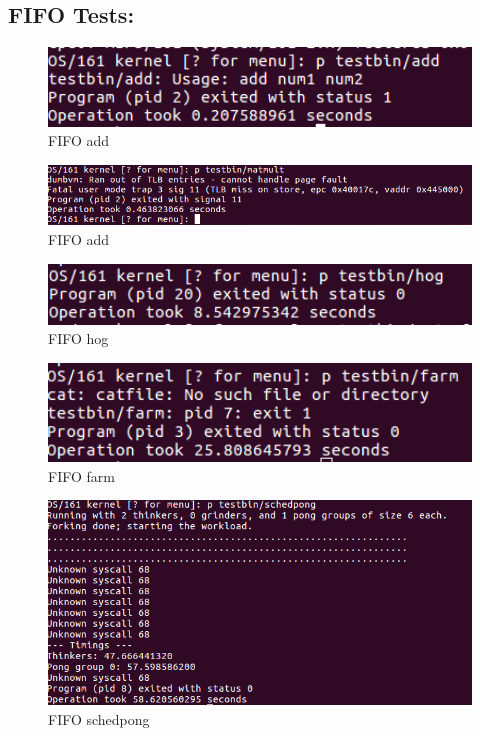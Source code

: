 \documentclass[12pt]{article}
\begin{document}
\subsection{FIFO Tests:}
\begin{figure}[ht!]
	\centering
	\includegraphics[width=120mm]{FIFOadd.png}
	\caption{FIFO add \label{FIFOADD}}
\end{figure}
\begin{figure}[ht!]
	\centering
	\includegraphics[width=120mm]{FIFOmatmult.png}
	\caption{FIFO add \label{FIFOMATMULT}}
\end{figure}
\begin{figure}[ht!]
	\centering
	\includegraphics[width=120mm]{FIFOhog.png}
	\caption{FIFO hog \label{FIFOHOG}}
\end{figure}
\begin{figure}[ht!]
	\centering
	\includegraphics[width=120mm]{FIFOfarm.png}
	\caption{FIFO farm \label{FIFOFARM}}
\end{figure}
\begin{figure}[ht!]
	\centering
	\includegraphics[width=120mm]{FIFOschedpong.png}
	\caption{FIFO schedpong \label{FIFOSCHEDPONG}}
\end{figure}
\newpage
\end{document}
